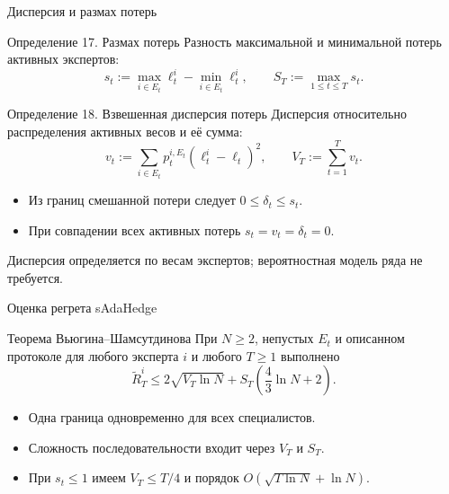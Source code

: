 \documentclass[11pt,aspectratio=169]{beamer}
\begin{document}
\begin{frame}{Дисперсия и размах потерь}
  \begin{block}{Определение 17. Размах потерь}
    Разность максимальной и минимальной потерь активных экспертов:
    \[
      s_t:=\max_{i\in E_t}\ell_t^i-\min_{i\in E_t}\ell_t^i,
      \qquad S_T:=\max_{1\le t\le T}s_t.
    \]
  \end{block}
  \begin{block}{Определение 18. Взвешенная дисперсия потерь}
    Дисперсия относительно распределения активных весов и её сумма:
    \[
      v_t:=\sum_{i\in E_t} p_t^{i,E_t}(\ell_t^i-\ell_t)^2,
      \qquad V_T:=\sum_{t=1}^T v_t.
    \]
  \end{block}
  \begin{itemize}
    \item Из границ смешанной потери следует $0\le\delta_t\le s_t$.
    \item При совпадении всех активных потерь $s_t=v_t=\delta_t=0$.
  \end{itemize}
  \par\vfill{\scriptsize Дисперсия определяется по весам экспертов; вероятностная модель ряда не требуется.\par}
\end{frame}

\begin{frame}{Оценка регрета sAdaHedge}
  \begin{block}{Теорема Вьюгина--Шамсутдинова}
    При $N\ge2$, непустых $E_t$ и описанном протоколе для любого
    эксперта $i$ и любого $T\ge1$ выполнено
    \[
      \widetilde R_T^i\le
      2\sqrt{V_T\ln N}+S_T\left(\frac43\ln N+2\right).
    \]
  \end{block}
  \medskip
  \begin{itemize}
    \item Одна граница одновременно для всех специалистов.
    \item Сложность последовательности входит через $V_T$ и $S_T$.
    \item При $s_t\le1$ имеем $V_T\le T/4$ и порядок
          $O(\sqrt{T\ln N}+\ln N)$.
  \end{itemize}
\end{frame}
\end{document}
